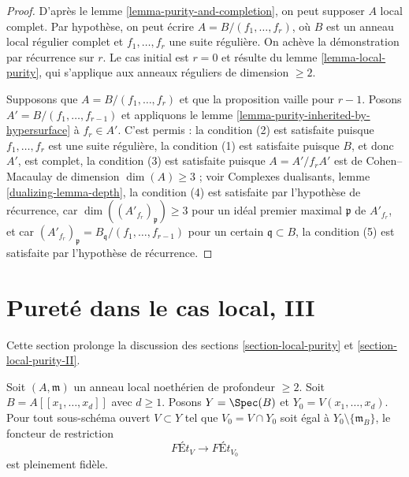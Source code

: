 \begin{proof}
D'après le lemme \ref{lemma-purity-and-completion}, on peut supposer $A$
local complet. Par hypothèse, on peut écrire
$A = B/(f_1, \ldots, f_r)$, où $B$ est un anneau local régulier complet
et $f_1, \ldots, f_r$ une suite régulière.
On achève la démonstration par récurrence sur $r$.
Le cas initial est $r = 0$ et résulte du
lemme \ref{lemma-local-purity}, qui s'applique aux
anneaux réguliers de dimension $\geq 2$.

\medskip\noindent
Supposons que $A = B/(f_1, \ldots, f_r)$ et que la proposition
vaille pour $r - 1$. Posons $A' = B/(f_1, \ldots, f_{r - 1})$ et appliquons le
lemme \ref{lemma-purity-inherited-by-hypersurface} à $f_r \in A'$.
C'est permis :
la condition (2) est satisfaite puisque $f_1, \ldots, f_r$ est une suite régulière,
la condition (1) est satisfaite puisque $B$, et donc $A'$, est complet,
la condition (3) est satisfaite puisque $A = A'/f_r A'$ est de Cohen--Macaulay de dimension
$\dim(A) \geq 3$ ; voir Complexes dualisants, lemme \ref{dualizing-lemma-depth},
la condition (4) est satisfaite par l'hypothèse de récurrence, car
$\dim((A'_{f_r})_\mathfrak p) \geq 3$ pour un idéal premier maximal
$\mathfrak p$ de $A'_{f_r}$, et car
$(A'_{f_r})_\mathfrak p = B_\mathfrak q/(f_1, \ldots, f_{r - 1})$
pour un certain $\mathfrak q \subset B$,
la condition (5) est satisfaite par l'hypothèse de récurrence.
\end{proof}




\section{Pureté dans le cas local, III}
\label{section-local-purity-III}

\noindent
Cette section prolonge la discussion des
sections \ref{section-local-purity} et \ref{section-local-purity-II}.

\begin{lemma}
\label{lemma-fully-faithful-power-series-over-depth2}
Soit $(A, \mathfrak m)$ un anneau local noethérien de profondeur $\geq 2$.
Soit $B = A[[x_1, \ldots, x_d]]$ avec $d \geq 1$.
Posons $Y = \Spec(B)$ et $Y_0 = V(x_1, \ldots, x_d)$.
Pour tout sous-schéma ouvert $V \subset Y$ tel que
$V_0 = V \cap Y_0$ soit égal à $Y_0 \setminus \{\mathfrak m_B\}$,
le foncteur de restriction
$$
\textit{F\'Et}_V \longrightarrow \textit{F\'Et}_{V_0}
$$
est pleinement fidèle.
\end{lemma}

